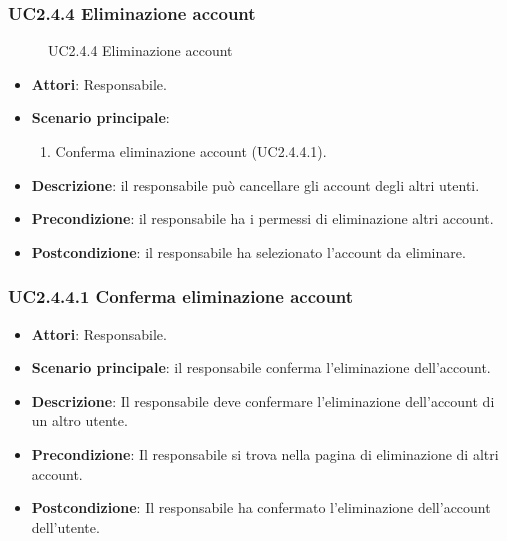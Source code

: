\subsubsection{UC2.4.4 Eliminazione account}
\begin{figure}[H]
\centering
\noindent{}
\caption{UC2.4.4 Eliminazione account}
\end{figure}
\begin{itemize}
\item \textbf{Attori}: Responsabile.
\item \textbf{Scenario principale}:
\begin{enumerate}
\item Conferma eliminazione account (UC2.4.4.1).
\end{enumerate}
\item \textbf{Descrizione}: il responsabile può cancellare gli account degli altri utenti.
\item \textbf{Precondizione}: il responsabile ha i permessi di eliminazione altri account.
\item \textbf{Postcondizione}: il responsabile ha selezionato l'account da eliminare.
\end{itemize}
\subsubsection{UC2.4.4.1 Conferma eliminazione account}
\begin{itemize}
\item \textbf{Attori}: Responsabile.
\item \textbf{Scenario principale}: il responsabile conferma l'eliminazione dell'account.
\item \textbf{Descrizione}: Il responsabile deve confermare l'eliminazione dell'account di un altro utente.
\item \textbf{Precondizione}: Il responsabile si trova nella pagina di eliminazione di altri account.
\item \textbf{Postcondizione}: Il responsabile ha confermato l'eliminazione dell'account dell'utente.
\end{itemize}
